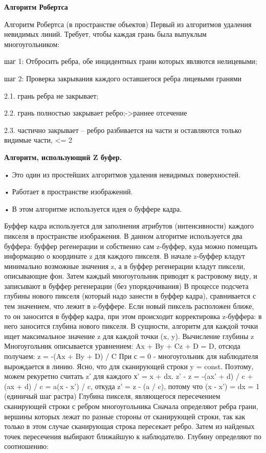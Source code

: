 \textbf{Алгоритм Робертса}

Алгоритм Робертса (в пространстве объектов)
Первый из алгоритмов удаления невидимых линий. Требует,
чтобы каждая грань была выпуклым многоугольником:

шаг 1: Отбросить ребра, обе инцидентных грани которых
являются нелицевыми;

шаг 2: Проверка закрывания каждого оставшегося ребра
лицевыми гранями

2.1. грань ребра не закрывает;

2.2. грань полностью закрывает ребро;->раннее отсечение

2.3. частично закрывает – ребро разбивается на части и
оставляются только видимые части, <= 2 

\textbf{Алгоритм, использующий Z буфер.}

    • Это один из простейших алгоритмов удаления невидимых поверхностей.
    
    • Работает в пространстве изображений.
    
    • В этом алгоритме используется идея о буффере кадра.
    
Буффер кадра используется для заполнения атрибутов (интенсивности) каждого пикселя в пространстве изображения.
 В данном алгоритме используется два буффера: буффер регенерации и собственно сам z-буффер, куда можно помещать информацию о координате z для каждого пикселя.
В начале z-буффер кладут минимально возможные значения z, а в буффер регенерации кладут пиксели, описывающие фон.
 Затем каждый многоугольник приводят к растровому виду, и записывают в буффер регенерации (без упорядочивания)
В процессе подсчета глубины нового пикселя (который надо занести в буффер кадра), сравнивается с тем значением, что лежит в z-буффере. Если новый пиксель расположен ближе, то он заносится в буффер кадра, при этом происходит корректировка z-буффера: в него заносится глубина нового пикселя. В сущности, алгоритм для каждой точки ищет максимальное значение z для каждой точки (x, y).
Вычисление глубины z
Многоугольник описывается уравнением: Ax + By + Cz + D = D, отсюда получаем:
 z = -(Ax + By + D) / C При с = 0 - многоугольник для наблюдателя вырождается в линию.
 Ясно, что для сканирующей строки y = const. Поэтому, можем рекуретно считать z' для каждого х' = x + dx.
z' - z = -(ax' + d) / c + (ax + d) / c = a(x - x') / c, откуда z' = z - (a / c), потому что (x - x') = dx = 1 (единичый шаг растра)
Глубина пикселя, являющегося пересечением сканирующей строки с ребром многоугольника
Сначала определяют ребра грани, вершины которых лежат по разные стороны от сканирующей строки, так как только в этом случае сканирующая строка пересекает ребро. Затем из найденых точек пересечения выбирают ближайшую к наблюдателю.
Глубину определяют по соотношению:

